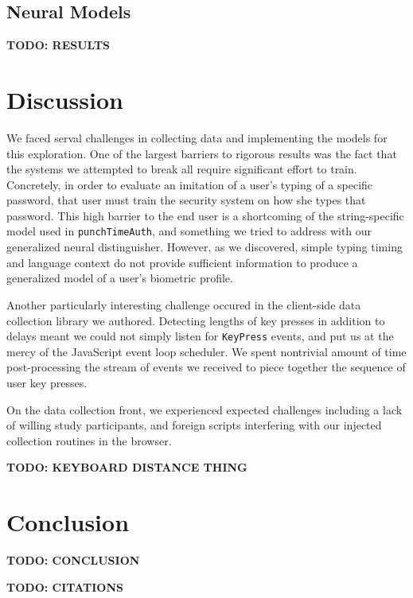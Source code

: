 \documentclass{amsart}
\begin{document}
\begin{multicols*}{2}
\subsection{Neural Models}

\textbf{TODO: RESULTS}

\section{Discussion}

We faced serval challenges in collecting data and implementing the models for this exploration. One of the largest barriers to rigorous results was the fact that the systems we attempted to break all require significant effort to train. Concretely, in order to evaluate an imitation of a user's typing of a specific password, that user must train the security system on how she types that password. This high barrier to the end user is a shortcoming of the string-specific model used in \texttt{punchTimeAuth}, and something we tried to address with our generalized neural distinguisher. However, as we discovered, simple typing timing and language context do not provide sufficient information to produce a generalized model of a user's biometric profile.

Another particularly interesting challenge occured in the client-side data collection library we authored. Detecting lengths of key presses in addition to delays meant we could not simply listen for \texttt{KeyPress} events, and put us at the mercy of the JavaScript event loop scheduler. We spent nontrivial amount of time post-processing the stream of events we received to piece together the sequence of user key presses.

On the data collection front, we experienced expected challenges including a lack of willing study participants, and foreign scripts interfering with our injected collection routines in the browser.

\textbf{TODO: KEYBOARD DISTANCE THING}

\section{Conclusion}

\textbf{TODO: CONCLUSION}

\textbf{TODO: CITATIONS}

\end{multicols*}
\end{document}
